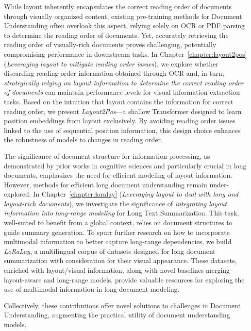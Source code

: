 While layout inherently encapsulates the correct reading order of documents through visually organized content, existing pre-training methods for Document Understanding often overlook this aspect, relying solely on \ac{OCR} or PDF parsing to determine the reading order of documents. Yet, accurately retrieving the reading order of visually-rich documents proves challenging, potentially compromising performance in downstream tasks. In Chapter~\ref{chapter:layout2pos} (\textit{Leveraging layout to mitigate reading order issues}), we explore whether discarding reading order information obtained through \ac{OCR} and, in turn, \textit{strategically relying on layout information to determine the correct reading order of documents} can maintain performance levels for visual information extraction tasks. Based on the intuition that layout contains the information for correct reading order, we present \textit{Layout2Pos}—a shallow Transformer designed to learn position embeddings from layout exclusively. By avoiding reading order issues linked to the use of sequential position information, this design choice enhances the robustness of models to changes in reading order.

The significance of document structure for information processing, as demonstrated by prior works in cognitive sciences and particularly crucial in long documents, emphasizes the need for efficient modeling of layout information. However, methods for efficient long document understanding remain under-explored. In Chapter~\ref{chapter:loralay} (\textit{Leveraging layout to deal with long and layout-rich documents}), we investigate the significance of \textit{integrating layout information into long-range modeling} for Long Text Summarization. This task, well-suited to benefit from a global context, relies on document structures to guide summary generation. To spurr further research on how to incorporate multimodal information to better capture long-range dependencies, we build \textit{LoRaLay}, a multilingual corpus of datasets designed for long document summarization with consideration for their visual appearance. These datasets, enriched with layout/visual information, along with novel baselines merging layout-aware and long-range models, provide valuable resources for exploring the use of multimodal information in long document modeling. 

Collectively, these contributions offer novel solutions to challenges in Document Understanding, augmenting the practical utility of document understanding models.


